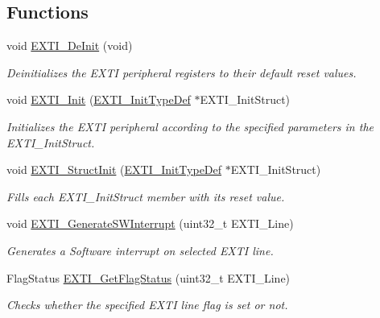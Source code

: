 \subsection*{Functions}
\begin{DoxyCompactItemize}
\item 
void \hyperlink{group___e_x_t_i_ga07072e339cb9ecb9cd9d4b94afc9f317}{E\-X\-T\-I\-\_\-\-De\-Init} (void)
\begin{DoxyCompactList}\small\item\em Deinitializes the E\-X\-T\-I peripheral registers to their default reset values. \end{DoxyCompactList}\item 
void \hyperlink{group___e_x_t_i_ga8c9ce6352a3a2dfc8fc9287cb24c6501}{E\-X\-T\-I\-\_\-\-Init} (\hyperlink{struct_e_x_t_i___init_type_def}{E\-X\-T\-I\-\_\-\-Init\-Type\-Def} $\ast$E\-X\-T\-I\-\_\-\-Init\-Struct)
\begin{DoxyCompactList}\small\item\em Initializes the E\-X\-T\-I peripheral according to the specified parameters in the E\-X\-T\-I\-\_\-\-Init\-Struct. \end{DoxyCompactList}\item 
void \hyperlink{group___e_x_t_i_ga86b9e662d18a2f829999cfb26aa7ca20}{E\-X\-T\-I\-\_\-\-Struct\-Init} (\hyperlink{struct_e_x_t_i___init_type_def}{E\-X\-T\-I\-\_\-\-Init\-Type\-Def} $\ast$E\-X\-T\-I\-\_\-\-Init\-Struct)
\begin{DoxyCompactList}\small\item\em Fills each E\-X\-T\-I\-\_\-\-Init\-Struct member with its reset value. \end{DoxyCompactList}\item 
void \hyperlink{group___e_x_t_i_ga897e8ea59f40a19e047fb9994876fc9b}{E\-X\-T\-I\-\_\-\-Generate\-S\-W\-Interrupt} (uint32\-\_\-t E\-X\-T\-I\-\_\-\-Line)
\begin{DoxyCompactList}\small\item\em Generates a Software interrupt on selected E\-X\-T\-I line. \end{DoxyCompactList}\item 
Flag\-Status \hyperlink{group___e_x_t_i_ga0ce06e6b312592df149800d63218cffa}{E\-X\-T\-I\-\_\-\-Get\-Flag\-Status} (uint32\-\_\-t E\-X\-T\-I\-\_\-\-Line)
\begin{DoxyCompactList}\small\item\em Checks whether the specified E\-X\-T\-I line flag is set or not. \end{DoxyCompactList}\item 

\end{DoxyCompactItemize}
